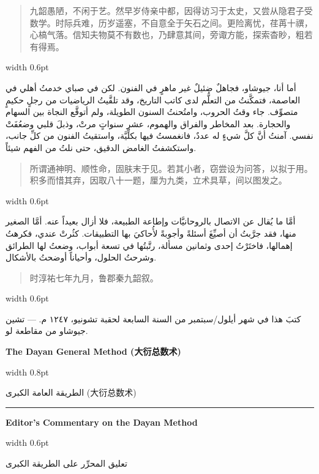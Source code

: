 \documentclass[11pt,a4paper]{article}
\newlength{\cnwidth}
\newlength{\arwidth}
\newcommand{\paralleltext}[2]{%
  \par\medskip\noindent
  \begin{minipage}[t]{\cnwidth}%
    \small #1%
  \end{minipage}%
  \hfill\textcolor{colrule}{\vrule width 0.6pt}\hfill
  \begin{minipage}[t]{\arwidth}%
    \small\arabicfont\beginR #2\endR%
  \end{minipage}%
  \par\medskip
}
\newcommand{\parallelsection}[2]{%
  \par\bigskip\noindent
  \begin{minipage}[t]{\cnwidth}%
    \Large\bfseries\color{sectioncolor} #1%
  \end{minipage}%
  \hfill\textcolor{colrule}{\vrule width 0.8pt}\hfill
  \begin{minipage}[t]{\arwidth}%
    \Large\arabicfontbf\color{sectioncolor}\beginR #2\endR%
  \end{minipage}%
  \par\medskip\noindent\textcolor{colrule}{\rule{\textwidth}{0.6pt}}\par\medskip
}
\newcommand{\parallelsubsection}[2]{%
  \par\medskip\noindent
  \begin{minipage}[t]{\cnwidth}%
    \large\bfseries\color{sectioncolor} #1%
  \end{minipage}%
  \hfill\textcolor{colrule}{\vrule width 0.6pt}\hfill
  \begin{minipage}[t]{\arwidth}%
    \large\arabicfontbf\color{sectioncolor}\beginR #2\endR%
  \end{minipage}%
  \par\smallskip
}
\newenvironment{cnquote}{\begin{quote}\color{prefacecolor}}{\end{quote}}
\begin{document}
\paralleltext{%
\begin{cnquote}
九韶愚陋，不闲于艺。然早岁侍亲中都，因得访习于太史，又尝从隐君子受数学。时际兵难，历岁遥塞，不自意全于矢石之间。更险离忧，荏苒十禩，心槁气落。信知夫物莫不有数也，乃肆意其间，旁诹方能，探索杳眇，粗若有得焉。
\end{cnquote}%
}{%
أما أنا، جيوشاو، فجاهلٌ ضئيلٌ غير ماهرٍ في الفنون. لكن في صباي خدمتُ أهلي في العاصمة، فتمكَّنتُ من التعلُّم لدى كاتب التاريخ، وقد تلقَّيتُ الرياضيات من رجلٍ حكيمٍ متصوِّف. جاء وقتُ الحروب، وامتُحنتُ السنون الطويلة، ولم أتوقَّع النجاة بين السهام والحجارة. بعد المخاطر والفراق والهموم، عشر سنواتٍ مرتْ، وذبلَ قلبي وضعُفَتْ نفسي. آمنتُ أنَّ كلَّ شيءٍ له عددٌ، فانغمستُ فيها بكلِّيَّة، واستقيتُ الفنون من كلِّ جانب، واستكشفتُ الغامض الدقيق، حتى نلتُ من الفهم شيئاً.
}

\paralleltext{%
\begin{cnquote}
所谓通神明、顺性命，固肤末于见。若其小者，窃尝设为问答，以拟于用。积多而惜其弃，因取八十一题，厘为九类，立术具草，间以图发之。
\end{cnquote}%
}{%
أمَّا ما يُقال عن الاتصال بالروحانيَّات وإطاعة الطبيعة، فلا أزال بعيداً عنه. أمَّا الصغير منها، فقد جرَّبتُ أن أصيِّغَ أسئلةً وأجوبةً لأُحاكيَ بها التطبيقات. كثُرتْ عندي، فكرهتُ إهمالها، فاختَرْتُ إحدى وثمانين مسألة، رتَّبتُها في تسعة أبواب، وضعتُ لها الطرائق وشرحتُ الحلول، وأحياناً أوضحتُ بالأشكال.
}

\paralleltext{%
\begin{cnquote}
时淳祐七年九月，鲁郡秦九韶叙。
\end{cnquote}%
}{%
كتبَ هذا في شهر أيلول/سبتمبر من السنة السابعة لحقبة تشونيو، ١٢٤٧ م. --- تشين جيوشاو من مقاطعة لو.
}

\newpage

\parallelsection{The Dayan General Method (大衍总数术)}{الطريقة العامة الكبرى (大衍总数术)}

\parallelsubsection{Editor's Commentary on the Dayan Method}{تعليق المحرِّر على الطريقة الكبرى}
\end{document}
